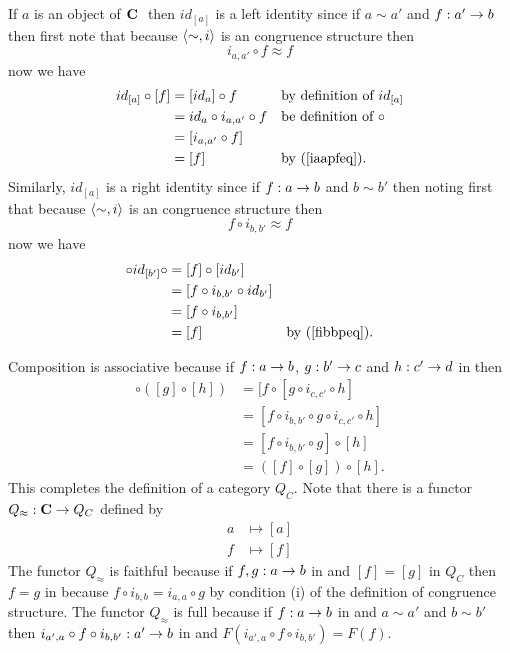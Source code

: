 \documentclass[10pt,a4paper]{article}
\theoremstyle{remark}
\begin{document}
If $a$ is an object of $\textbf{C}\ $ then $id_{[a]}$ is a left identity since if  $a \sim a'$ and $f:a' \rightarrow b$ then 
first note that because $\langle\sim,i\rangle$ is an congruence structure then
\begin{equation}
\label{iaapfeq}
i_{a,a'} \circ f  \approx f
\end{equation}
now we have 
\begin{align*}
id_{[a]} \circ [f] 
         & = [id_a] \circ f               && \mbox{by definition of $id_{[a]}$}    \\
				 & = id_a \circ i_{a,a'} \circ f  && \mbox{be definition of $\circ$}       \\
         &= [i_{a,a'} \circ f]                                                     \\
         &= [f]                           && \mbox {by (\ref{iaapfeq}). }
\end{align*}
Similarly, $id_{[a]}$ is a right identity since if $f:a \rightarrow b$ and $b \sim b'$  then
noting first  that because $\langle\sim,i\rangle$ is an congruence structure then
\begin{equation}
\label{fibbpeq}
 f \circ i_{b,b'} \approx f
\end{equation}
now we have 
\begin{align*}
[f] \circ id_{[b']} \circ  
                 & = [f]  \circ [id_{b'}]                                     \\
                 &=  [f \circ i_{b,b'} \circ id_{b'} ]                                  \\
                 &=  [f \circ i_{b,b'} ]                                                \\
                 &=  [f]                               &&\mbox {by (\ref{fibbpeq}). }
\end{align*}


Composition is associative because if $f:a \rightarrow b$, $g: b' \rightarrow c$  and $h: c' \rightarrow d$ in \catcw then
\begin{align*}
[f] \circ ([g] \circ [h]) &= [f \circ [g \circ i_{c,c'} \circ h]               \\
                          &= [f \circ i_{b,b'} \circ g \circ i_{c,c'} \circ h] \\
													&= [f \circ i_{b,b'} \circ g] \circ [h]              \\
													&= ([f] \circ [g]) \circ [h].
\end{align*}
This completes the definition of a category $Q_C$.
Note that there is a functor $Q_\approx: \textbf{C} \rightarrow Q_C$ defined by
\begin{align*}
       a & \mapsto [a] \\
			 f & \mapsto [f]
\end{align*}
The functor $Q_\approx$ is faithful because if $f,g : a \rightarrow b$ in \catcw and $[f]=[g]$ in $Q_C$
then $f=g$ in \catcw because $f \circ i_{b,b}=i_{a,a} \circ g$ by condition (i) of the definition of congruence structure.
The functor $Q_\approx$ is full because if $f:a \rightarrow b$ in \catcw and $a \sim a'$ and
$b \sim b'$ then $i_{a',a} \circ f \circ i_{b,b'}: a' \rightarrow b$ in \catcw and 
$F(i_{a',a} \circ f \circ i_{b,b'})=F(f)$.  
\end{document}

